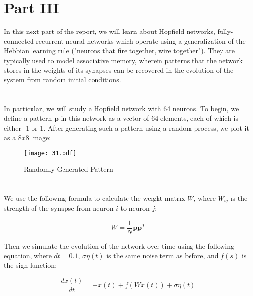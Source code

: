\documentclass{article}
\begin{document}
\setcounter{section}{0}
\renewcommand{\thesection}{3.\arabic{section}}
\section*{Part III}
In this next part of the report, we will learn about Hopfield networks, fully-connected recurrent neural networks which operate using a generalization of the Hebbian learning rule ("neurons that fire together, wire together"). They are typically used to model associative memory, wherein patterns that the network stores in the weights of its synapses can be recovered in the evolution of the system from random initial conditions. 

\section{}
 In particular, we will study a Hopfield network with 64 neurons. To begin, we define a pattern $\boldsymbol{p}$ in this network as a vector of 64 elements, each of which is either -1 or 1. After generating such a pattern using a random process, we plot it as a $8x8$ image:

\begin{figure}[ht]
    \centering
    \texttt{[image: 31.pdf]}
    \caption{Randomly Generated Pattern}
\end{figure}



\section{}
We use the following formula to calculate the weight matrix $W$, where $W_{ij}$ is the strength of the synapse from neuron $i$ to neuron $j$:

\begin{equation}
    W = \frac{1}{N} \boldsymbol{p} \boldsymbol{p}^T
\end{equation}
\vspace{.1em}

Then we simulate the evolution of the network over time using the following equation, where $dt = 0.1$, $\sigma \eta(t)$ is the same noise term as before, and $f(s)$ is the sign function:

\begin{equation}
    \frac{dx(t)}{dt} =  -x(t) + f(Wx(t)) + \sigma \eta(t)
\end{equation}
\vspace{.1em}
\end{document}
